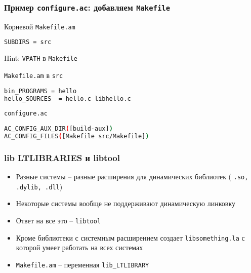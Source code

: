 \begin{frame}[fragile]
	\frametitle{Пример \texttt{configure.ac}: добавляем {\tt Makefile}}
	\begin{block}{Корневой \texttt{Makefile.am}}
\begin{lstlisting}[language=sh]
SUBDIRS = src
\end{lstlisting}

	Hint: {\tt VPATH} в {\tt Makefile}
\end{block}


	\begin{block}{\texttt{Makefile.am} в {\tt src}}
\begin{lstlisting}[language=sh]
bin_PROGRAMS = hello
hello_SOURCES  = hello.c libhello.c
\end{lstlisting}
	\end{block}

	\begin{block}{\texttt{configure.ac}}
\begin{lstlisting}[language=sh]
AC_CONFIG_AUX_DIR([build-aux])
AC_CONFIG_FILES([Makefile src/Makefile])
\end{lstlisting}
	\end{block}

\end{frame}


\begin{frame}[fragile]
\frametitle{lib LTLIBRARIES и libtool}
\begin{itemize}
 \item Разные системы -- разные расширения для динамических библиотек (
\texttt{.so, .dylib, .dll})
 \item Некоторые системы вообще не поддерживают динамическую линковку
 \item Ответ на все это -- \texttt{libtool}
 \item Кроме библиотеки с системным расширением создает \texttt{libsomething.la} с которой умеет работать на всех системах
 \item \texttt{Makefile.am} -- переменная \verb+lib_LTLIBRARY+ 
\end{itemize}
\end{frame}

